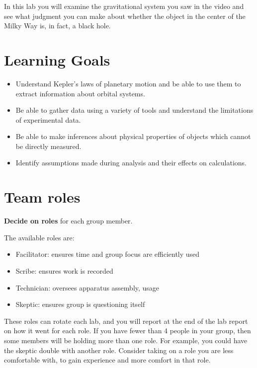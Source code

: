 In this lab you will examine the gravitational system you saw in the video and see what judgment you can make about whether the object in the center of the Milky Way is, in fact, a black hole.%

\section{Learning Goals}
\begin{itemize}
	\item Understand Kepler's laws of planetary motion and be able to use them to extract information about orbital systems.
	\item Be able to gather data using a variety of tools and understand the limitations of experimental data.
	\item Be able to make inferences about physical properties of objects which cannot be directly measured.
	\item Identify assumptions made during analysis and their effects on calculations.
\end{itemize}

\section{Team roles}

\begin{steps}
	\item \textbf{Decide on roles} for each group member.
\end{steps}

The available roles are:

\begin{itemize}
	\item Facilitator: ensures time and group focus are efficiently used
	\item Scribe: ensures work is recorded
	\item Technician: oversees apparatus assembly, usage
	\item Skeptic: ensures group is questioning itself
\end{itemize}

These roles can rotate each lab, and you will report at the end of the lab report on how it went for each role. If you have fewer than 4 people in your group, then some members will be holding more than one role. For example, you could have the skeptic double with another role. Consider taking on a role you are less comfortable with, to gain experience and more comfort in that role.

